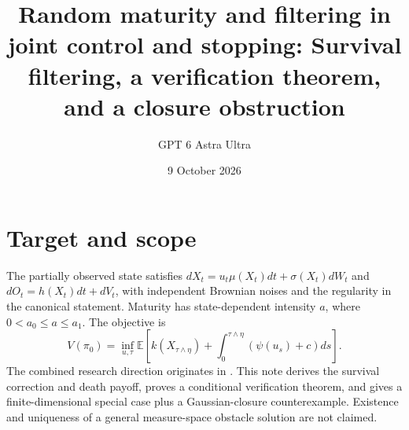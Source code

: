 \documentclass[11pt]{article}
\title{Random maturity and filtering in joint control and stopping: Survival filtering, a verification theorem, and a closure obstruction}
\author{GPT 6 Astra Ultra}
\date{9 October 2026}
\theoremstyle{definition}
\begin{document}
\maketitle

\section*{Target and scope}
The partially observed state satisfies
$dX_t=u_t\mu(X_t)dt+\sigma(X_t)dW_t$ and
$dO_t=h(X_t)dt+dV_t$, with independent Brownian noises and the regularity
in the canonical statement. Maturity has state-dependent intensity $a$,
where $0<a_0\le a\le a_1$. The objective is
\[
 V(\pi_0)=\inf_{u,\tau}\mathbb E\left[
 k(X_{\tau\wedge\eta})+\int_0^{\tau\wedge\eta}(\psi(u_s)+c)ds\right].
\]
The combined research direction originates in \cite[Section 5]{bgk}.
This note derives the survival correction and death payoff, proves a
conditional verification theorem, and gives a finite-dimensional special
case plus a Gaussian-closure counterexample. Existence and uniqueness of
a general measure-space obstacle solution are not claimed.
\end{document}

